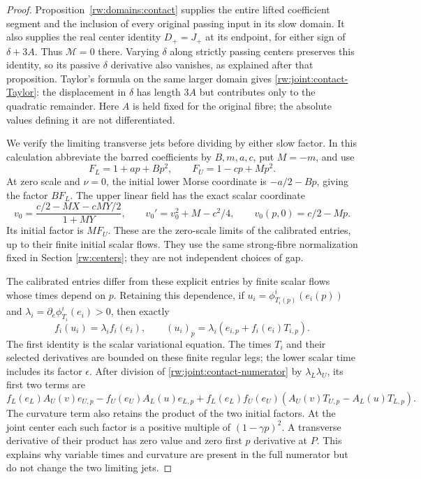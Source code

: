 \begin{proof}
Proposition~\ref{rw:domains:contact} supplies the entire lifted
coefficient segment and the inclusion of every original passing
input in its slow domain. It also supplies the real center identity
$D_+=J_+$ at its endpoint, for either sign of $\delta+3A$.
Thus $\mathcal M=0$ there. Varying $\delta$ along strictly passing
centers preserves this identity, so its passive $\delta$ derivative
also vanishes, as explained after that proposition. Taylor's formula
on the same larger domain gives \eqref{rw:joint:contact-Taylor}: the
displacement in $\delta$ has length $3A$ but contributes only to the
quadratic remainder. Here $A$ is held fixed for the original fibre;
the absolute values defining it are not differentiated.

We verify the limiting transverse jets before dividing by either
slow factor. In this calculation abbreviate the barred coefficients
by $B,m,a,c$, put $M=-m$, and use
\[
 F_L=1+ap+Bp^2,\qquad F_U=1-cp+Mp^2.
\]
At zero scale and $\nu=0$, the initial lower Morse coordinate is
$-a/2-Bp$, giving the factor $BF_L$. The upper linear field
has the exact scalar coordinate
\[
 v_0=\frac{c/2-MX-cMY/2}{1+MY},\qquad
 v_0'=v_0^2+M-c^2/4,\qquad v_0(p,0)=c/2-Mp.
\]
Its initial factor is $MF_U$. These are the zero-scale limits of
the calibrated entries, up to their finite initial scalar flows.
They use the same strong-fibre normalization fixed in Section
\ref{rw:centers}; they are not independent choices of gap.

The calibrated entries differ from these explicit entries by finite
scalar flows whose times depend on $p$. Retaining this dependence, if
$u_i=\phi^i_{T_i(p)}(e_i(p))$ and
$\lambda_i=\partial_e\phi^i_{T_i}(e_i)>0$, then exactly
\begin{equation}\label{rw:joint:variable-time}
 f_i(u_i)=\lambda_i f_i(e_i),\qquad
 (u_i)_p=\lambda_i(e_{i,p}+f_i(e_i)T_{i,p}).
\end{equation}
The first identity is the scalar variational equation. The times
$T_i$ and their selected derivatives are bounded on these finite
regular legs; the lower scalar time includes its factor $\epsilon$.
After division of \eqref{rw:joint:contact-numerator} by
$\lambda_L\lambda_U$, its first two terms are
\[
 f_L(e_L)A_U(v)e_{U,p}-f_U(e_U)A_L(u)e_{L,p}
 +f_L(e_L)f_U(e_U)(A_U(v)T_{U,p}-A_L(u)T_{L,p}).
\]
The curvature term also retains the product of the two initial
factors. At the joint center each such factor is a positive
multiple of $(1-\gamma p)^2$. A transverse derivative of their
product has zero value and zero first $p$ derivative at $P$.
This explains why variable times and curvature are present in the
full numerator but do not change the two limiting jets.


\end{proof}
